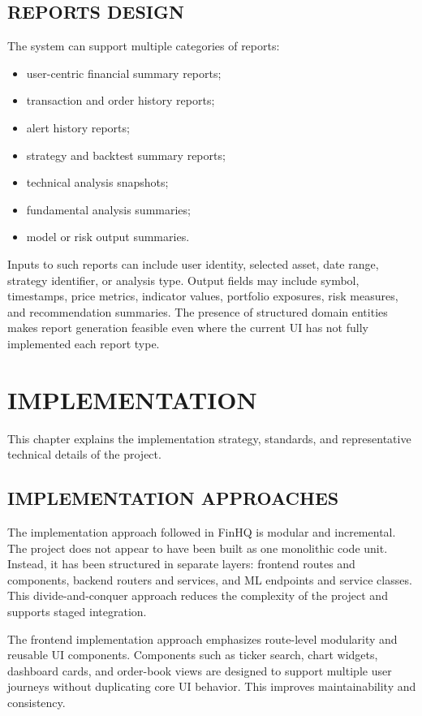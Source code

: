 \documentclass[12pt,a4paper]{report}
\newcommand{\projectshort}{FinHQ}
\begin{document}
\section{REPORTS DESIGN}
The system can support multiple categories of reports:
\begin{itemize}
\item user-centric financial summary reports;
\item transaction and order history reports;
\item alert history reports;
\item strategy and backtest summary reports;
\item technical analysis snapshots;
\item fundamental analysis summaries;
\item model or risk output summaries.
\end{itemize}

Inputs to such reports can include user identity, selected asset, date range, strategy identifier, or analysis type. Output fields may include symbol, timestamps, price metrics, indicator values, portfolio exposures, risk measures, and recommendation summaries. The presence of structured domain entities makes report generation feasible even where the current UI has not fully implemented each report type.

\chapter{IMPLEMENTATION}
This chapter explains the implementation strategy, standards, and representative technical details of the project.

\section{IMPLEMENTATION APPROACHES}
The implementation approach followed in \projectshort{} is modular and incremental. The project does not appear to have been built as one monolithic code unit. Instead, it has been structured in separate layers: frontend routes and components, backend routers and services, and ML endpoints and service classes. This divide-and-conquer approach reduces the complexity of the project and supports staged integration.

The frontend implementation approach emphasizes route-level modularity and reusable UI components. Components such as ticker search, chart widgets, dashboard cards, and order-book views are designed to support multiple user journeys without duplicating core UI behavior. This improves maintainability and consistency.
\end{document}
